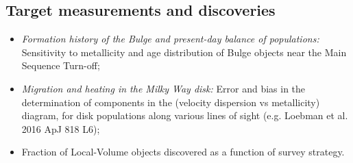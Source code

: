 \subsection{Target measurements and discoveries}
\label{sec:\secname:MW_Future_targets}


\begin{itemize}
  \item {\it Formation history of the Bulge and present-day balance of populations:} Sensitivity to metallicity and age distribution of Bulge objects near the Main Sequence Turn-off;
    \item {\it Migration and heating in the Milky Way disk:} Error and bias in the determination of components in the (velocity dispersion vs metallicity) diagram, for disk populations along various lines of sight (e.g. Loebman et al. 2016 ApJ 818 L6);
    \item Fraction of Local-Volume objects discovered as a function of survey strategy.
\end{itemize}
















\navigationbar
